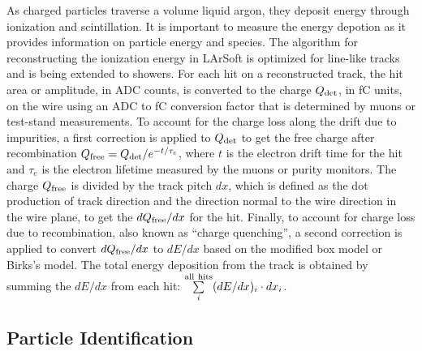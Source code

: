 As charged particles traverse a volume liquid argon, they deposit
energy through ionization and scintillation. It is important to
measure the energy depotion as it provides information on particle
energy and species. The algorithm for reconstructing the ionization
energy in LArSoft is optimized for line-like tracks and is being
extended to showers. 
For each hit on a reconstructed track, the hit area or amplitude, in ADC counts, is
converted to the charge $Q_{\rm{det}}$, in fC units, on the wire using an
ADC to fC conversion factor that is determined by muons or test-stand
measurements. To account for the charge loss along the drift due to
impurities, a first correction is applied to $Q_{\rm{det}}$ to get the free
charge after recombination $Q_{\rm{free}} = Q_{\rm{det}}/e^{-t/\tau_{e}}$, where
$t$ is the electron drift time for the hit and $\tau_{e}$ is the
electron lifetime measured by the muons or purity monitors. The charge
$Q_{\rm{free}}$ is divided by the track pitch $dx$, which is defined as the
dot production of track direction and the direction normal to the wire
direction in the wire plane, to get the $dQ_{\rm{free}}/dx$ for the
hit. Finally, to account for charge loss due to recombination, also
known as ``charge quenching'', a second correction is applied to
convert $dQ_{\rm{free}}/dx$ to $dE/dx$ based on the modified box model
\cite{Thomas:1987zz} or Birks's model\cite{Birks:1964zz}. The total energy
deposition from the track is obtained by summing the $dE/dx$ from each
hit: $\sum\limits_{i}^{\rm{all\ hits}}(dE/dx)_{i}\cdot dx_{i}$.

%


\subsection{Particle Identification}

